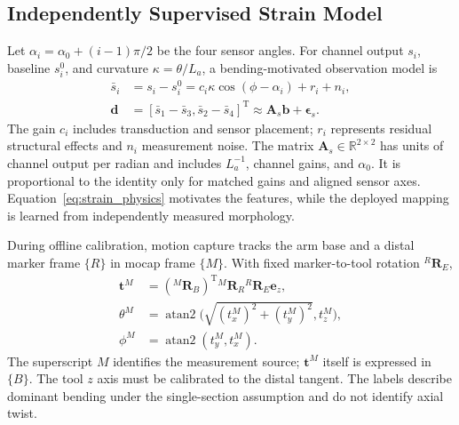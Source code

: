 \documentclass[journal,twoside]{IEEEtran}
\begin{document}
\subsection{Independently Supervised Strain Model}
Let $\alpha_i=\alpha_0+(i-1)\pi/2$ be the four sensor angles. For channel output $s_i$, baseline $s_i^0$, and curvature $\kappa=\theta/L_a$, a bending-motivated observation model is
\begin{equation}
\begin{aligned}
\bar s_i&=s_i-s_i^0=c_i\kappa\cos(\phi-\alpha_i)+r_i+n_i,\\
\mathbf d&=[\bar s_1-\bar s_3,\bar s_2-\bar s_4]^{\mathrm T}
\approx\mathbf A_s\mathbf b+\boldsymbol\epsilon_s.
\end{aligned}
\label{eq:strain_physics}
\end{equation}
The gain $c_i$ includes transduction and sensor placement; $r_i$ represents residual structural effects and $n_i$ measurement noise. The matrix $\mathbf A_s\in\mathbb R^{2\times2}$ has units of channel output per radian and includes $L_a^{-1}$, channel gains, and $\alpha_0$. It is proportional to the identity only for matched gains and aligned sensor axes. Equation~\eqref{eq:strain_physics} motivates the features, while the deployed mapping is learned from independently measured morphology.

During offline calibration, motion capture tracks the arm base and a distal marker frame $\{R\}$ in mocap frame $\{M\}$. With fixed marker-to-tool rotation ${}^{R}\mathbf R_E$,
\begin{equation}
\begin{aligned}
\mathbf t^M&=({}^{M}\mathbf R_B)^{\mathrm T}
{}^{M}\mathbf R_R{}^{R}\mathbf R_E\mathbf e_z,\\
\theta^M&=\operatorname{atan2}\big(\sqrt{(t_x^M)^2+(t_y^M)^2},t_z^M\big),\\
\phi^M&=\operatorname{atan2}(t_y^M,t_x^M).
\end{aligned}
\label{eq:mocap_label}
\end{equation}
The superscript $M$ identifies the measurement source; $\mathbf t^M$ itself is expressed in $\{B\}$. The tool $z$ axis must be calibrated to the distal tangent. The labels describe dominant bending under the single-section assumption and do not identify axial twist.
\end{document}
